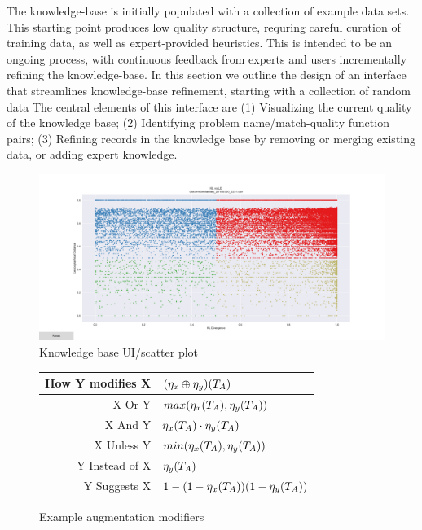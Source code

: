
The \systemname knowledge-base is initially populated with a collection of example data sets.
This starting point produces low quality structure, requring careful curation of training data, as well as expert-provided heuristics.
This is intended to be an ongoing process, with continuous feedback from experts and users incrementally refining the knowledge-base.
In this section we outline the design of an interface that streamlines knowledge-base refinement, starting with a collection of random data
The central elements of this interface are 
(1) Visualizing the current quality of the knowledge base;
(2) Identifying problem name/match-quality function pairs;
(3) Refining records in the knowledge base by removing or merging existing data, or adding expert knowledge.

\begin{figure}
	\centering
	\includegraphics[width=1\columnwidth]{graphics/KBUI}
	\caption{Knowledge base UI/scatter plot}
	\label{fig:Knowledge base user interface}
\end{figure}


\begin{figure}
\begin{tabular}{r|l}
\textbf{How Y modifies X} & $(\eta_x \oplus \eta_y)(T_A)$ \\\hline
X Or Y & $max(\eta_x(T_A), \eta_y(T_A))$\\
X And Y & $\eta_x(T_A) \cdot \eta_y(T_A)$\\
X Unless Y & $min(\eta_x(T_A), \eta_y(T_A))$\\
Y Instead of X & $\eta_y(T_A)$\\
Y Suggests X & $1-(1-\eta_x(T_A))(1-\eta_y(T_A))$
\end{tabular}
\caption{Example augmentation modifiers}
\label{fig:modifiers}
\end{figure}

